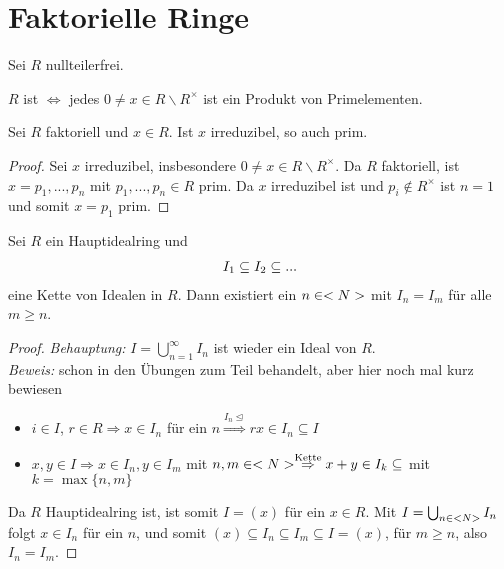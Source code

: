 \section{Faktorielle Ringe}

Sei $R$ nullteilerfrei.

\begin{definition}
	$R$ ist  $\iff$ jedes $0\neq x\in R\backslash R^\times$ ist ein Produkt von Primelementen.
\end{definition}

\begin{lemma}
	Sei $R$ faktoriell und $x\in R$. Ist $x$ irreduzibel, so auch prim.
\end{lemma}
\begin{proof}
	Sei $x$ irreduzibel, insbesondere $0\neq x\in R\backslash R^\times$. Da $R$ faktoriell, ist $x=p_1,...,p_n$ mit $p_1,...,p_n\in R$ prim. Da $x$ irreduzibel ist und $p_i\notin R^\times$ ist $n=1$ und somit $x=p_1$ prim.
\end{proof}

\begin{lemma}
	Sei $R$ ein Hauptidealring und 
	\begin{align}
		I_1\subseteq I_2\subseteq ...\notag
	\end{align}
	eine Kette von Idealen in $R$. Dann existiert ein $n\in<N>$ mit $I_n=I_{m}$ für alle $m\ge n$.
\end{lemma}
\begin{proof}
	\emph{Behauptung:} $I=\bigcup_{n=1}^\infty I_n$ ist wieder ein Ideal von $R$. \\
	\emph{Beweis:} schon in den Übungen zum Teil behandelt, aber hier noch mal kurz bewiesen
	\begin{itemize}
		\item $i\in I$, $r\in R\Rightarrow x\in I_n$ für ein $n\overset{I_n\unlhd}{\Rightarrow} rx\in I_n\subseteq I$
		\item $x,y\in I\Rightarrow x\in I_n,y\in I_m$ mit $n,m\in<N>\overset{\text{Kette}}{\Rightarrow} x+y\in I_k\subseteq$ mit $k=\max\{n,m\}$
	\end{itemize}
	Da $R$ Hauptidealring ist, ist somit $I=(x)$ für ein $x\in R$. Mit $I=\bigcup_{n\in<N>} I_n$ folgt $x\in I_n$ für ein $n$, und somit $(x)\subseteq I_n\subseteq I_m\subseteq I=(x)$, für $m\ge n$, also $I_n=I_m$.
\end{proof}

